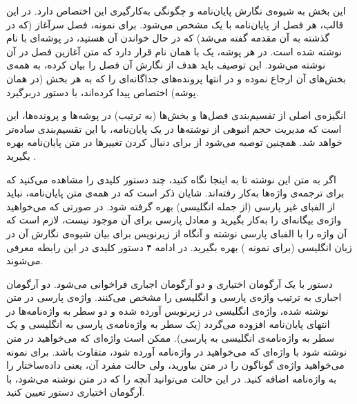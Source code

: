 
این بخش به شیوه‌ی نگارش پایان‌نامه و چگونگی به‌کارگیری این  اختصاص دارد.
در این قالب، هر فصل از پایان‌نامه با یک  مشخص می‌شود. برای نمونه، فصل سرآغاز (که در گذشته به آن مقدمه گفته می‌شد) که در حال خواندن آن هستید، در پوشه‌ای با نام  نوشته شده است. در هر پوشه، یک  با همان نام قرار دارد که متن آغازین فصل در آن نوشته می‌شود. این توصیف باید هدف از نگارش آن فصل را بیان کرده، به همه‌ی بخش‌های آن ارجاع نموده و در انتها پرونده‌های جداگانه‌ای را که به هر بخش (در همان پوشه) اختصاص پیدا کرده‌اند، با دستور  دربرگیرد.

انگیزه‌ی اصلی از تقسیم‌بندی فصل‌ها و بخش‌ها (به ترتیب) در پوشه‌ها و پرونده‌ها، این است که مدیریت حجم انبوهی از نوشته‌ها در یک پایان‌نامه، با این تقسیم‌بندی ساده‌تر خواهد شد. همچنین توصیه می‌شود از   برای دنبال کردن تغییرها در متن پایان‌نامه بهره بگیرید 
.

اگر به متن  این نوشته تا به اینجا نگاه کنید، چند دستور کلیدی را مشاهده می‌کنید که برای ترجمه‌ی واژه‌ها به‌کار رفته‌اند. شایان ذکر است که در همه‌ی متن پایان‌نامه، نباید از الفبای غیر پارسی (از جمله انگلیسی) بهره گرفته شود. در صورتی که می‌خواهید واژه‌ی بیگانه‌ای را به‌کار بگیرید و معادل پارسی برای آن موجود نیست، لازم است که آن واژه را با الفبای پارسی نوشته و آنگاه از زیرنویس برای بیان شیوه‌ی نگارش آن در زبان انگلیسی (برای نمونه ) بهره  بگیرید. در ادامه ۴ دستور کلیدی در این رابطه معرفی می‌شوند.

	 دستور  با یک آرگومان اختیاری و دو آرگومان اجباری فراخوانی می‌شود. دو آرگومان اجباری به ترتیب واژه‌ی پارسی و انگلیسی را مشخص می‌کنند. واژه‌ی پارسی در متن نوشته شده، واژه‌ی انگلیسی در زیرنویس آورده شده و دو سطر به واژه‌نامه‌ها در انتهای پایان‌نامه افزوده می‌گردد (یک سطر به واژه‌نامه‌ی پارسی به انگلیسی و یک سطر به واژه‌نامه‌ی انگلیسی به پارسی). ممکن است واژه‌ای که می‌خواهید در متن نوشته شود با واژه‌ای که می‌خواهید در واژه‌نامه آورده شود، متفاوت باشد. برای نمونه می‌خواهید واژه‌ی  گوناگون را در متن بیاورید، ولی حالت مفرد آن، یعنی داده‌ساختار را به واژه‌نامه اضافه کنید. در این حالت می‌توانید آنچه را که در متن نوشته می‌شود، با آرگومان اختیاری دستور  تعیین کنید.
	
